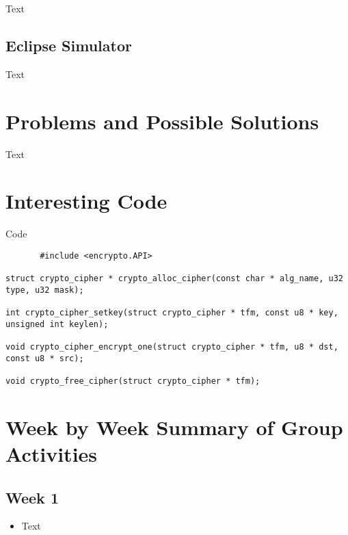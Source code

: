 \documentclass[10pt, onecolumn, draftclsnofoot, letterpaper, compsoc]{IEEEtran}
\begin{document}
Text

\subsection{Eclipse Simulator}

Text

\section{Problems and Possible Solutions}

Text

\section{Interesting Code}

Code


\begin{lstlisting}
       #include <encrypto.API>

struct crypto_cipher * crypto_alloc_cipher(const char * alg_name, u32 type, u32 mask);

int crypto_cipher_setkey(struct crypto_cipher * tfm, const u8 * key, unsigned int keylen);

void crypto_cipher_encrypt_one(struct crypto_cipher * tfm, u8 * dst, const u8 * src);

void crypto_free_cipher(struct crypto_cipher * tfm);
\end{lstlisting}

\section{Week by Week Summary of Group Activities}

\subsection{Week 1}

\begin{itemize}

\item Text

\end{itemize}
\end{document}
